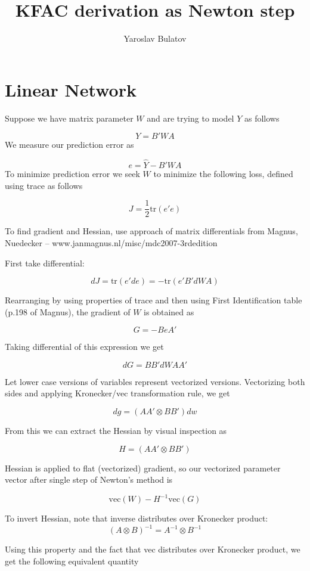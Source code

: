 \documentclass{article}
\begin{document}
\title{KFAC derivation as Newton step}
\author{Yaroslav Bulatov}

\maketitle
\section*{Linear Network}
Suppose we have matrix parameter $W$ and are trying to model $Y$ as follows

$$Y = B'W A$$
We measure our prediction error as

$$e = \hat{Y}-B'WA$$
To minimize prediction error we seek $W$ to minimize the following loss, defined using trace as follows

$$J = \frac{1}{2}\text{tr}(e'e)$$

To find gradient and Hessian, use approach of matrix differentials from Magnus, Nuedecker -- www.janmagnus.nl/misc/mdc2007-3rdedition

First take differential:

$$dJ = \text{tr}(e'de) = -\text{tr}(e'B'dWA)$$

Rearranging by using properties of trace and then using First Identification table (p.198 of Magnus), the gradient of $W$ is obtained as

$$G=-BeA'$$

Taking differential of this expression we get

$$dG = BB'dW AA'$$

Let lower case versions of variables represent vectorized versions. Vectorizing both sides and applying Kronecker/vec transformation rule, we get

$$dg = (AA'\otimes BB')dw$$

From this we can extract the Hessian by visual inspection as

$$H = (AA'\otimes BB')$$

Hessian is applied to flat (vectorized) gradient, so our vectorized parameter vector after single step of Newton's method is

$$\text{vec}(W)-H^{-1}\text{vec}(G)$$

To invert Hessian, note that inverse distributes over Kronecker product:
$$(A\otimes B)^{-1}=A^{-1}\otimes B^{-1}$$

Using this property and the fact that vec distributes over Kronecker product, we get the following equivalent quantity
\end{document}
